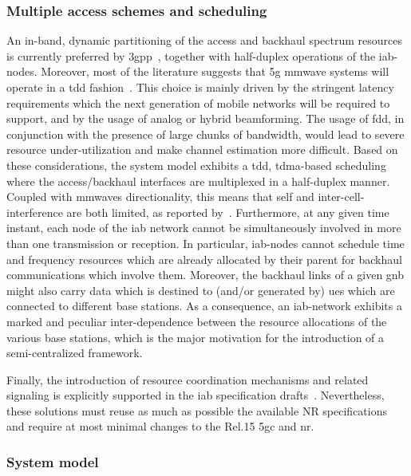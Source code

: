 \subsubsection{Multiple access schemes and scheduling}
An in-band, dynamic partitioning of the access and backhaul spectrum resources is currently preferred by \gls{3gpp}~\cite{3gpp_38_874, 3gpp_38_174}, together with half-duplex operations of the \gls{iab}-nodes. Moreover, most of the literature suggests that \gls{5g} \gls{mmwave} systems will operate in a \gls{tdd} fashion~\cite{khan2011mmwave, dutta2017frame}. This choice is mainly driven by the stringent latency requirements which the next generation of mobile networks will be required to support, and by the usage of analog or hybrid beamforming. The usage of \gls{fdd}, in conjunction with the presence of large chunks of bandwidth, would lead to severe resource under-utilization and make channel estimation more difficult.
Based on these considerations, the system model exhibits a \gls{tdd}, \gls{tdma}-based scheduling where the access/backhaul interfaces are multiplexed in a half-duplex manner. 
Coupled with \glspl{mmwave} directionality, this means that self and inter-cell-interference are both limited, as reported by~\cite{qualcomm1}.
Furthermore, at any given time instant, each node of the \gls{iab} network cannot be simultaneously involved in more than one transmission or reception. In particular, \gls{iab}-nodes cannot schedule time and frequency resources which are already allocated by their parent for backhaul communications which involve them.
Moreover, the backhaul links of a given \gls{gnb} might also carry data which is destined to (and/or generated by) \glspl{ue} which are connected to different base stations. 
As a consequence, an \gls{iab}-network exhibits a marked and peculiar inter-dependence between the resource allocations of the various base stations, which is the major motivation for the introduction of a semi-centralized framework. 

Finally, the introduction of resource coordination mechanisms and related signaling is explicitly supported in the \gls{iab} specification drafts~\cite{3gpp_38_874, 3gpp_38_174}. Nevertheless, these solutions must reuse as much as possible the available NR specifications and
require at most minimal changes to the Rel.15 \gls{5gc} and \gls{nr}.


\subsubsection{System model}
\label{Subsec:sys_model}

